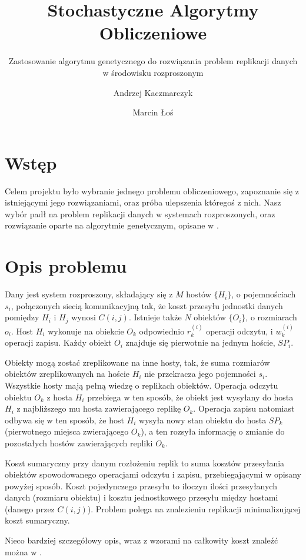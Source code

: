 \documentclass[11pt,pdftex,a4paper]{scrartcl}
\title{Stochastyczne Algorytmy Obliczeniowe}
\subtitle{ 
  Zastosowanie algorytmu genetycznego do rozwiązania problem replikacji danych
  w środowisku rozproszonym
}
\date{}
\author{
  Andrzej Kaczmarczyk
  \and
  Marcin Łoś
}
\begin{document}
\maketitle

\section{Wstęp}
Celem projektu było wybranie jednego problemu obliczeniowego, zapoznanie się z istniejącymi jego
rozwiązaniami, oraz próba ulepszenia któregoś z nich. Nasz wybór padł na problem replikacji danych
w systemach rozproszonych, oraz rozwiązanie oparte na algorytmie genetycznym, opisane w \cite{Ahmad}.

\section{Opis problemu}
Dany jest system rozproszony, składający się z \(M\) hostów \(\{H_i\}\), o pojemnościach \(s_i\), 
połączonych siecią komunikacyjną tak, że koszt przesyłu jednostki danych pomiędzy \(H_i\) i \(H_j\)
wynosi \(C(i,j)\). Istnieje także \(N\) obiektów \(\{O_i\}\), o rozmiarach \(o_i\). Host \(H_i\)
wykonuje na obiekcie \(O_k\) odpowiednio \(r^{(i)}_k\) operacji odczytu, i \(w^{(i)}_k\) operacji
zapisu. Każdy obiekt \(O_i\) znajduje się pierwotnie na jednym hoście, \(SP_i\).

Obiekty mogą zostać zreplikowane na inne hosty, tak, że suma rozmiarów obiektów zreplikowanych
na hoście \(H_i\) nie przekracza jego pojemności \(s_i\). Wszystkie hosty mają pełną wiedzę o 
replikach obiektów. Operacja odczytu obiektu \(O_k\) z hosta \(H_i\) przebiega w ten sposób, że
obiekt jest wysyłany do hosta \(H_i\) z najbliższego mu hosta zawierającego replikę \(O_k\).
Operacja zapisu natomiast odbywa się w ten sposób, że host \(H_i\) wysyła nowy stan obiektu do
hosta \(SP_k\) (pierwotnego miejsca zwierającego \(O_k\)), a ten rozsyła informację o zmianie do
pozostałych hostów zawierających repliki \(O_k\). 

Koszt sumaryczny przy danym rozłożeniu replik to suma kosztów przesyłania obiektów spowodowanego
operacjami odczytu i zapisu, przebiegającymi w opisany powyżej sposób. Koszt pojedynczego przesyłu
to iloczyn ilości przesyłanych danych (rozmiaru obiektu) i kosztu jednostkowego przesyłu między
hostami (danego przez \(C(i,j)\)). Problem polega na znalezieniu replikacji minimalizującej koszt
sumaryczny.

Nieco bardziej szczegółowy opis, wraz z wzorami na całkowity koszt znaleźć można w \cite{Ahmad}.
\end{document}
